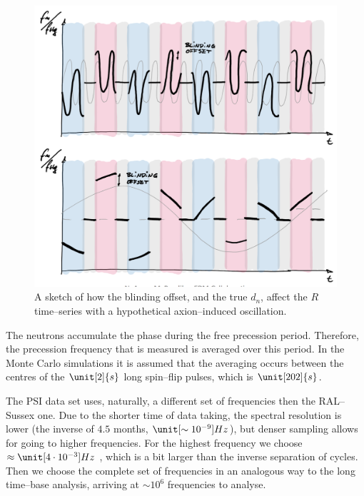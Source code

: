 \begin{figure}[htb]
  \centering \includegraphics[width=\linewidth]{gfx/axions/cycle-level_blinding_offset.png}
  \caption{A sketch of how the blinding offset, and the true $d_n$, affect the $R$ time--series with a hypothetical axion--induced oscillation.}
  \label{fig:cycle-level_blinding_offset}
\end{figure}

The neutrons accumulate the phase during the free precession period. Therefore, the precession frequency that is measured is averaged over this period. In the Monte Carlo simulations it is assumed that the averaging occurs between the centres of the $\unit[2]{s}$ long spin--flip pulses, which is $\unit[202]{s}$.


The PSI data set uses, naturally, a different set of frequencies then the RAL--Sussex one. Due to the shorter time of data taking, the spectral resolution is lower (the inverse of $4.5$ months, $\unit[\sim 10^{-9}]{Hz}$), but denser sampling allows for going to higher frequencies. For the highest frequency we choose $\approx \unit[4 \cdot 10^{-3}]{Hz}$ , which is a bit larger than the inverse separation of cycles. Then we choose the complete set of frequencies in an analogous way to the long time--base analysis, arriving at $\sim 10^6$ frequencies to analyse.

